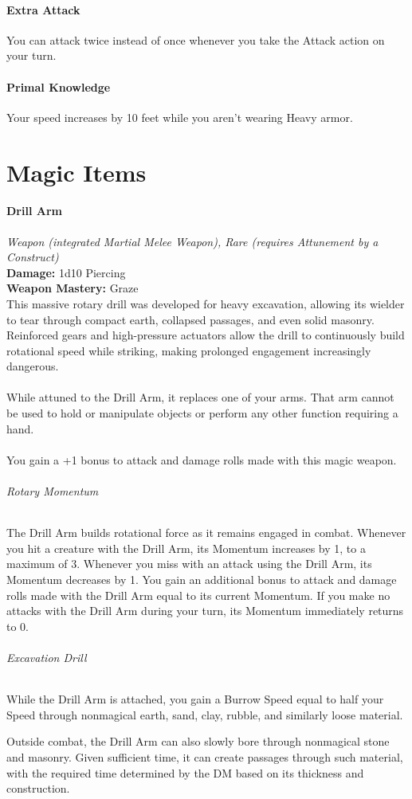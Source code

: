 \documentclass[letterpaper,openany,oneside,twocolumn]{book}
\begin{document}
\subsection*{Extra Attack}
You can attack twice instead of once whenever you take the Attack action on your turn.
\subsection*{Primal Knowledge}
Your speed increases by 10 feet while you aren't wearing Heavy armor.

\part*{Magic Items}
\subsection*{Drill Arm}
\textit{Weapon (integrated Martial Melee Weapon), Rare (requires Attunement by a Construct)}\\
\textbf{Damage:} 1d10 Piercing\\
\textbf{Weapon Mastery:} Graze\\
This massive rotary drill was developed for heavy excavation, allowing its wielder to tear through compact earth, collapsed passages, and even solid masonry. Reinforced gears and high-pressure actuators allow the drill to continuously build rotational speed while striking, making prolonged engagement increasingly dangerous.\\\\
While attuned to the Drill Arm, it replaces one of your arms. That arm cannot be used to hold or manipulate objects or perform any other function requiring a hand.\\\\
You gain a +1 bonus to attack and damage rolls made with this magic weapon.\\
\paragraph*{Rotary Momentum} The Drill Arm builds rotational force as it remains engaged in combat. Whenever you hit a creature with the Drill Arm, its Momentum increases by 1, to a maximum of 3. Whenever you miss with an attack using the Drill Arm, its Momentum decreases by 1. You gain an additional bonus to attack and damage rolls made with the Drill Arm equal to its current Momentum. If you make no attacks with the Drill Arm during your turn, its Momentum immediately returns to 0.\\
\paragraph*{Excavation Drill} While the Drill Arm is attached, you gain a Burrow Speed equal to half your Speed through nonmagical earth, sand, clay, rubble, and similarly loose material.

Outside combat, the Drill Arm can also slowly bore through nonmagical stone and masonry. Given sufficient time, it can create passages through such material, with the required time determined by the DM based on its thickness and construction.
\end{document}
